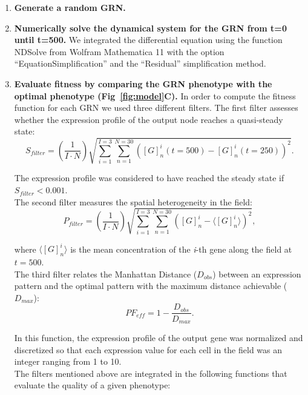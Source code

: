 \documentclass[10pt,letterpaper]{article}
\begin{document}
\begin{enumerate}
 \item{\bf Generate a random GRN.}

 \item{\bf Numerically solve the dynamical system for the GRN from t=0 until
 t=500.} We integrated the differential equation using the function NDSolve from
 Wolfram Mathematica 11 with the option “EquationSimplification” and the
 “Residual” simplification method.

 \item{\bf Evaluate fitness by comparing the GRN phenotype with the optimal
 phenotype (Fig~\ref{fig:model}C).} In order to compute the fitness
 function for each GRN we used three different filters. The first filter
 assesses whether the expression profile of the output node reaches a
 quasi-steady state:
 \begin{equation}
  S_{filter} = \left( \frac{1}{I \cdot N}\right) \sqrt{\sum_{i=1}^{I=3}
  \sum_{n=1}^{N=30} ([G]_n^i(t=500) - [G]^i_n(t=250))^2}.
 \end{equation}

 The expression profile was considered to have reached the steady state if
 $S_{filter} < 0.001$.\\

 The second filter measures the spatial heterogeneity in the field:
 \begin{equation}
  P_{filter} = \left( \frac{1}{I \cdot N} \right) \sqrt{ \sum_{i=1}^{I=3}
  \sum_{n=1}^{N=30} \left( [G]^i_n - \langle [G]^i_n \rangle \right)^2 },
 \end{equation}

 where $\langle [G]^i_n \rangle$ is the mean concentration of the \emph{i}-th
 gene along the field at $t=500$.\\

 The third filter relates the Manhattan Distance ($D_{obs}$) between an
 expression pattern and the optimal pattern with the maximum distance achievable
 ($D_{max}$):
 \begin{equation}
  \mathit{PF}_{eff} = 1 - \frac{D_{obs}}{D_{max}}.
 \end{equation}

 In this function, the expression profile of the output gene was normalized and
 discretized so that each expression value for each cell in the field was an
 integer ranging from 1 to 10.\\

 The filters mentioned above are integrated in the following functions that
 evaluate the quality of a given phenotype:


\end{enumerate}
\end{document}

